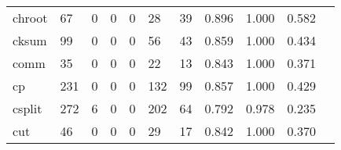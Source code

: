 \begin{longtable}{lp{1.2cm}p{1.2cm}p{1.2cm}p{1.2cm}p{1.2cm}p{1.2cm}p{1.2cm}p{1.2cm}p{1.2cm}p{1.2cm}}
chroot    &                                    67 &                                                  0 &                                                  0 &                                                  0 &                                                 28 &                                                 39 &                                              0.896 &                                              1.000 &                                              0.582 \\
cksum     &                                    99 &                                                  0 &                                                  0 &                                                  0 &                                                 56 &                                                 43 &                                              0.859 &                                              1.000 &                                              0.434 \\
comm      &                                    35 &                                                  0 &                                                  0 &                                                  0 &                                                 22 &                                                 13 &                                              0.843 &                                              1.000 &                                              0.371 \\
cp        &                                   231 &                                                  0 &                                                  0 &                                                  0 &                                                132 &                                                 99 &                                              0.857 &                                              1.000 &                                              0.429 \\
csplit    &                                   272 &                                                  6 &                                                  0 &                                                  0 &                                                202 &                                                 64 &                                              0.792 &                                              0.978 &                                              0.235 \\
cut       &                                    46 &                                                  0 &                                                  0 &                                                  0 &                                                 29 &                                                 17 &                                              0.842 &                                              1.000 &                                              0.370 \\

\end{longtable}
